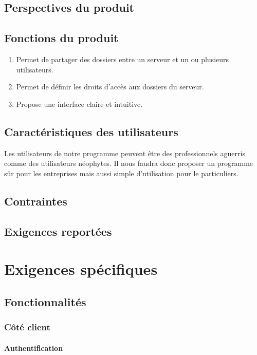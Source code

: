 \documentclass[10pt,a4paper]{report}
\begin{document}
\subsection{Perspectives du produit}

\subsection{Fonctions du produit}
\begin{enumerate}
\item Permet de partager des dossiers entre un serveur et un ou plusieurs utilisateurs.
\item Permet de définir les droits d'accès aux dossiers du serveur.
\item Propose une interface claire et intuitive.
\end{enumerate}

\subsection{Caractéristiques des utilisateurs}
Les utilisateurs de notre programme peuvent être des professionnels aguerris comme des utilisateurs néophytes. Il nous faudra donc proposer un programme sûr pour les entreprises mais aussi simple d'utilisation pour le particuliers.

\subsection{Contraintes}

\subsection{Exigences reportées}

\section{Exigences spécifiques}

\subsection{Fonctionnalités}

\subsubsection{Côté client}
\paragraph{Authentification}
\end{document}
